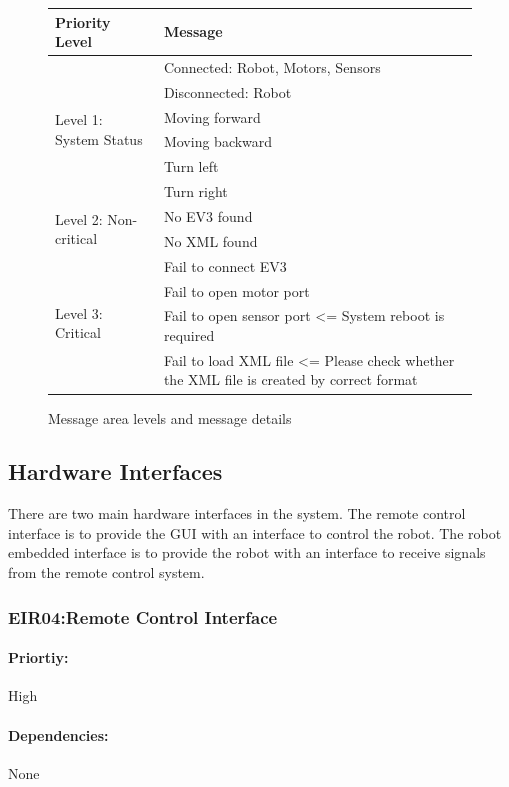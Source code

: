 \documentclass[10pt,a4paper,titlepage]{article}
\begin{document}
	\begin{figure}
		\centering
		\begin{tabular}{|p{4cm}|p{6cm}|}
			\hline 
			\textbf{Priority Level} &\textbf{Message} \\ \hline 
			\multirow{6}{*}{Level 1: System Status} 
			& Connected: Robot, Motors, Sensors \\ \cline{2-2}
			& Disconnected: Robot \\ \cline{2-2}
			& Moving forward \\ \cline{2-2}
			& Moving backward \\ \cline{2-2}
			& Turn left \\ \cline{2-2}
			& Turn right \\ 
			\hline 
			\multirow{2}{*}{Level 2: Non-critical} 
			& No EV3 found \\ \cline{2-2}
			& No XML found \\ 
			\hline 
			\multirow{4}{*}{Level 3: Critical} 
			& Fail to connect EV3 \\ \cline{2-2}
			& Fail to open motor port \\ \cline{2-2}
			& Fail to open sensor port <= System reboot is required \\ \cline{2-2}
			& Fail to load XML file <= Please check whether the XML file is created by correct format \\ 
			\hline 
		\end{tabular} 
		\caption{Message area levels and message details}
		\label{fig:message display details}
	\end{figure}
	
	\subsection{Hardware Interfaces}
	There are two main hardware interfaces in the system. The remote control interface is to provide the GUI with an interface to control the robot. The robot embedded interface is to provide the robot with an interface to receive signals from the remote control system.
	
	\subsubsection*{EIR04:Remote Control Interface}
	\paragraph{Priortiy:} High
	\paragraph{Dependencies:} None
\end{document}
